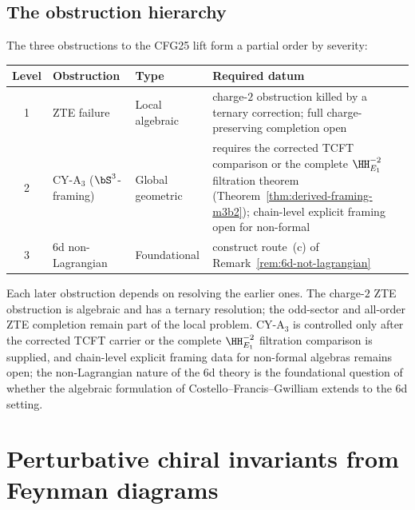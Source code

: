 \subsection{The obstruction hierarchy}
\label{subsec:cfg25-obstruction-hierarchy}

The three obstructions to the CFG25 lift form a partial order by severity:

\begin{center}
\renewcommand{\arraystretch}{1.3}
\small
\begin{tabular}{cllp{6cm}}
 \toprule
 \textbf{Level} & \textbf{Obstruction} & \textbf{Type} & \textbf{Required datum} \\
 \midrule
 1 & ZTE failure & Local algebraic & charge-$2$ obstruction killed by a ternary correction; full charge-preserving completion open \\
 2 & CY-A$_3$ ($\bS^3$-framing) & Global geometric & requires the corrected TCFT comparison or the complete $\HH^{-2}_{E_1}$ filtration theorem (Theorem~\ref{thm:derived-framing-m3b2}); chain-level explicit framing open for non-formal \\
 3 & 6d non-Lagrangian & Foundational & construct route~(c) of Remark~\ref{rem:6d-not-lagrangian} \\
 \bottomrule
\end{tabular}
\end{center}

\noindent Each later obstruction depends on resolving the earlier ones. The charge-$2$ ZTE obstruction is algebraic and has a ternary resolution; the odd-sector and all-order ZTE completion remain part of the local problem. CY-A$_3$ is controlled only after the corrected TCFT carrier or the complete $\HH^{-2}_{E_1}$ filtration comparison is supplied, and chain-level explicit framing data for non-formal algebras remains open; the non-Lagrangian nature of the 6d theory is the foundational question of whether the algebraic formulation of Costello--Francis--Gwilliam extends to the 6d setting.



\section{Perturbative chiral invariants from Feynman diagrams}
\label{sec:perturbative-chiral-feynman}

